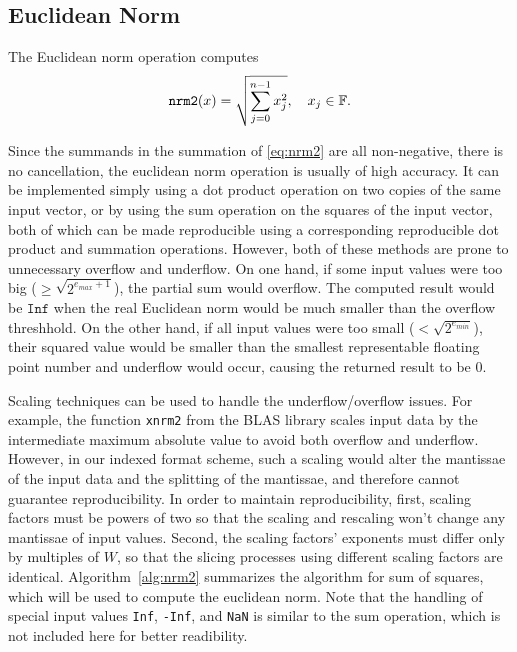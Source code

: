 \subsection{Euclidean Norm}
  \label{sec:compositeops_nrm}
    
    The Euclidean norm operation computes
    \begin{equation}
        \texttt{nrm2}(x) = \sqrt{\sum_{j=0}^{n-1} x_j^2}, \quad x_j \in \mathbb{F}.
        \label{eq:nrm2}
    \end{equation}

    Since the summands in the summation of \eqref{eq:nrm2} are all non-negative,
    there is no cancellation, the euclidean norm operation
    is usually of high accuracy.
    It can be implemented simply using a dot product operation on two copies of the same input vector,
    or by using the sum operation on the squares of the input vector,
    both of which can be made reproducible using a corresponding reproducible
    dot product and summation operations. However, both of these methods are prone to unnecessary overflow and underflow.
    On one hand, if some input values were too big ($\geq \sqrt{2^{e_{max}+1}}$),
    the partial sum would overflow. The computed result would
    be $\texttt{Inf}$ when the real Euclidean norm would be much smaller than the
    overflow threshhold.
    On the other hand, if all input values were too small ($ < \sqrt{2^{e_{min}}}$),
    their squared value would be smaller than the smallest representable floating point number and 
    underflow would occur, causing the returned result to be 0.

    Scaling techniques can be used to handle the underflow/overflow issues.
    For example, the function \texttt{xnrm2} from the BLAS library \cite{BLAS}
    scales input data by the intermediate maximum absolute value
    to avoid both overflow and underflow.
    However, in our indexed format scheme, such a scaling would alter
    the mantissae of the input data and the splitting of the mantissae, and therefore
    cannot guarantee reproducibility.
    In order to maintain reproducibility, 
    first, scaling factors must be powers of two so that the scaling and rescaling
    won't change any mantissae of input values.
    Second, the scaling factors' exponents must differ only by multiples of $W$,
    so that the slicing processes using different scaling factors are identical.
    Algorithm~\ref{alg:nrm2} summarizes the algorithm for sum of squares,
    which will be used to compute the euclidean norm.
    Note that the handling of special input values \texttt{Inf}, \texttt{-Inf}, and \texttt{NaN}
    is similar to the sum operation, which is not included here for better readibility.

